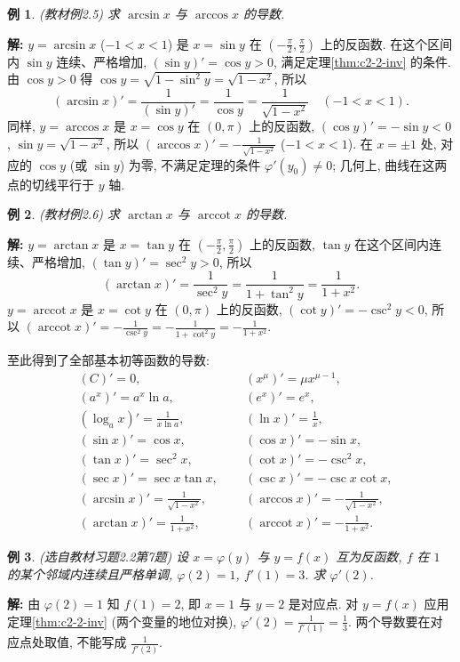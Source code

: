 \documentclass[UTF8,openany]{ctexbook}
\theoremstyle{chinesetextbook}
\newtheorem{example}{例}[section]
\newenvironment{cnsolution}{\par\indent\textbf{解:} \ignorespaces}{\par}
\begin{document}
\begin{example}\label{ex:c2-2-5}
\textnormal{(教材例2.5)} 求 $\arcsin x$ 与 $\arccos x$ 的导数.
\end{example}
\begin{cnsolution}
$y=\arcsin x$ ($-1<x<1$) 是 $x=\sin y$ 在 $\displaystyle\left(-\frac\pi2,\frac\pi2\right)$ 上的反函数. 在这个区间内 $\sin y$ 连续、严格增加, $(\sin y)'=\cos y>0$, 满足定理\ref{thm:c2-2-inv} 的条件. 由 $\cos y>0$ 得 $\cos y=\sqrt{1-\sin^2y}=\sqrt{1-x^2}$, 所以
\[
(\arcsin x)'=\frac1{(\sin y)'}=\frac1{\cos y}=\frac1{\sqrt{1-x^2}}\quad(-1<x<1).
\]
同样, $y=\arccos x$ 是 $x=\cos y$ 在 $(0,\pi)$ 上的反函数, $(\cos y)'=-\sin y<0$, $\sin y=\sqrt{1-x^2}$, 所以 $\displaystyle(\arccos x)'=-\frac1{\sqrt{1-x^2}}$ ($-1<x<1$). 在 $x=\pm1$ 处, 对应的 $\cos y$ (或 $\sin y$) 为零, 不满足定理的条件 $\varphi'(y_0)\ne0$; 几何上, 曲线在这两点的切线平行于 $y$ 轴.
\end{cnsolution}
\begin{example}\label{ex:c2-2-6}
\textnormal{(教材例2.6)} 求 $\arctan x$ 与 $\operatorname{arccot}x$ 的导数.
\end{example}
\begin{cnsolution}
$y=\arctan x$ 是 $x=\tan y$ 在 $\displaystyle\left(-\frac\pi2,\frac\pi2\right)$ 上的反函数, $\tan y$ 在这个区间内连续、严格增加, $(\tan y)'=\sec^2y>0$, 所以
\[
(\arctan x)'=\frac1{\sec^2y}=\frac1{1+\tan^2y}=\frac1{1+x^2}.
\]
$y=\operatorname{arccot}x$ 是 $x=\cot y$ 在 $(0,\pi)$ 上的反函数, $(\cot y)'=-\csc^2y<0$, 所以 $\displaystyle(\operatorname{arccot}x)'=-\frac1{\csc^2y}=-\frac1{1+\cot^2y}=-\frac1{1+x^2}$.
\end{cnsolution}
至此得到了全部基本初等函数的导数:
\[
\begin{aligned}
&(C)'=0, &&(x^\mu)'=\mu x^{\mu-1},\\
&(a^x)'=a^x\ln a, &&(e^x)'=e^x,\\
&(\log_ax)'=\frac1{x\ln a}, &&(\ln x)'=\frac1x,\\
&(\sin x)'=\cos x, &&(\cos x)'=-\sin x,\\
&(\tan x)'=\sec^2x, &&(\cot x)'=-\csc^2x,\\
&(\sec x)'=\sec x\tan x, &&(\csc x)'=-\csc x\cot x,\\
&(\arcsin x)'=\frac1{\sqrt{1-x^2}}, &&(\arccos x)'=-\frac1{\sqrt{1-x^2}},\\
&(\arctan x)'=\frac1{1+x^2},\qquad &&(\operatorname{arccot}x)'=-\frac1{1+x^2}.
\end{aligned}
\]
\begin{example}\label{ex:c2-h2-7}
\textnormal{(选自教材习题2.2第7题)} 设 $x=\varphi(y)$ 与 $y=f(x)$ 互为反函数, $f$ 在 $1$ 的某个邻域内连续且严格单调, $\varphi(2)=1$, $f'(1)=3$. 求 $\varphi'(2)$.
\end{example}
\begin{cnsolution}
由 $\varphi(2)=1$ 知 $f(1)=2$, 即 $x=1$ 与 $y=2$ 是对应点. 对 $y=f(x)$ 应用定理\ref{thm:c2-2-inv} (两个变量的地位对换), $\displaystyle\varphi'(2)=\frac1{f'(1)}=\frac13$. 两个导数要在对应点处取值, 不能写成 $\displaystyle\frac1{f'(2)}$.
\end{cnsolution}
\end{document}
